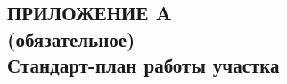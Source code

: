 \renewcommand{\thefigure}{\Asbuk{section}.\arabic{figure}}
\renewcommand{\thetable}{\Asbuk{section}.\arabic{table}}
\renewcommand{\thelstlisting}{\Asbuk{section}.\arabic{lstlisting}}

\begin{landscape}
\section*{
  ПРИЛОЖЕНИЕ A \\ 
  (обязательное) \\ 
  Стандарт-план работы участка
}
\label{sec:appendix_a}

\pagestyle{fancy}
\fancyhf{}  %
\fancyfoot[R]{\thepage}
\renewcommand{\headrulewidth}{0pt}
\renewcommand{\footrulewidth}{0pt}

\setlength{\headheight}{10mm}
\setlength{\headsep}{\baselineskip}

\thispagestyle{plain}

\setcounter{section}{1}
\setcounter{figure}{0}
\setcounter{table}{0}
\setcounter{lstlisting}{0}


\end{landscape}
